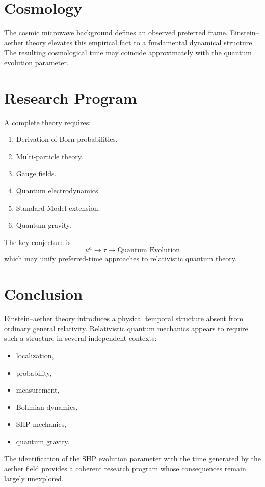 \documentclass[11pt]{book}
\begin{document}
\chapter{Cosmology}
The cosmic microwave background defines an observed preferred
frame.
Einstein--aether theory elevates this empirical fact to a
fundamental dynamical structure.
The resulting cosmological time may coincide approximately
with the quantum evolution parameter.

\chapter{Research Program}
A complete theory requires:
\begin{enumerate}
\item Derivation of Born probabilities.
\item Multi-particle theory.
\item Gauge fields.
\item Quantum electrodynamics.
\item Standard Model extension.
\item Quantum gravity.
\end{enumerate}
The key conjecture is
\[\boxed{u^a\rightarrow\tau\rightarrow\text{Quantum Evolution}}\]
which may unify preferred-time approaches to
relativistic quantum theory.

\backmatter

\chapter*{Conclusion}
Einstein--aether theory introduces a physical temporal
structure absent from ordinary general relativity.
Relativistic quantum mechanics appears to require such a
structure in several independent contexts:
\begin{itemize}
\item localization,
\item probability,
\item measurement,
\item Bohmian dynamics,
\item SHP mechanics,
\item quantum gravity.
\end{itemize}
The identification of the SHP evolution parameter with the
time generated by the aether field provides a coherent
research program whose consequences remain largely unexplored.
\end{document}
